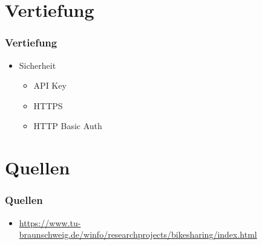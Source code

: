 \section{Vertiefung}
\begin{frame}
	\frametitle*{Vertiefung}
	\begin{itemize}
		\item Sicherheit
			\begin{itemize}
				\item API Key
				\item HTTPS
				\item HTTP Basic Auth
			\end{itemize}
	\end{itemize}
\end{frame}

\section{Quellen}
\begin{frame}
	\frametitle*{Quellen}
	\begin{itemize}
		\item \url{https://www.tu-braunschweig.de/winfo/researchprojects/bikesharing/index.html}
	\end{itemize}
\end{frame}
